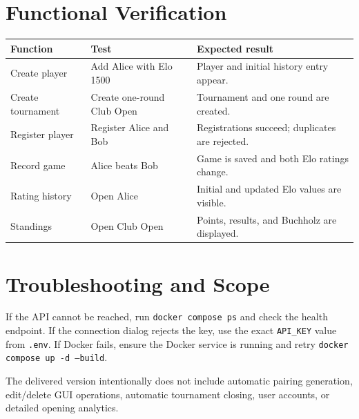 \documentclass[11pt,a4paper]{article}
\begin{document}
\section{Functional Verification}
\begin{center}
\begin{tabular}{>{\raggedright\arraybackslash}p{3.2cm} >{\raggedright\arraybackslash}p{4.8cm} >{\raggedright\arraybackslash}p{5.2cm}}
\toprule
\textbf{Function} & \textbf{Test} & \textbf{Expected result} \\
\midrule
Create player & Add Alice with Elo 1500 & Player and initial history entry appear. \\
Create tournament & Create one-round Club Open & Tournament and one round are created. \\
Register player & Register Alice and Bob & Registrations succeed; duplicates are rejected. \\
Record game & Alice beats Bob & Game is saved and both Elo ratings change. \\
Rating history & Open Alice & Initial and updated Elo values are visible. \\
Standings & Open Club Open & Points, results, and Buchholz are displayed. \\
\bottomrule
\end{tabular}
\end{center}

\section{Troubleshooting and Scope}
If the API cannot be reached, run \texttt{docker compose ps} and check the health endpoint. If the connection dialog rejects the key, use the exact \texttt{API\_KEY} value from \texttt{.env}. If Docker fails, ensure the Docker service is running and retry \texttt{docker compose up -d --build}.

The delivered version intentionally does not include automatic pairing generation, edit/delete GUI operations, automatic tournament closing, user accounts, or detailed opening analytics.
\end{document}
